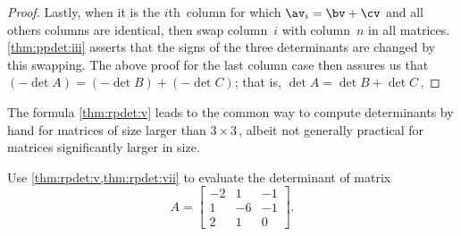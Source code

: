 \begin{proof}
Lastly, when it is the \(i\)th~column for which \(\av_i=\bv+\cv\) and all others columns are identical, then swap column~\(i\) with column~\(n\) in all matrices.  
\cref{thm:ppdet:iii} asserts that the signs of the three determinants are changed by this swapping.
The above proof for the last column case then assures us that \((-\det A)=(-\det B)+(-\det C)\); that is, \(\det A=\det B+\det C\)\,, 
\end{proof}


The  formula \cref{thm:rpdet:v} leads to the common way to compute determinants by hand for matrices of size larger than \(3\times3\)\,, albeit not generally practical for matrices significantly larger in size.

\begin{example} 
Use \cref{thm:rpdet:v,thm:rpdet:vii} to evaluate the determinant of matrix
\begin{equation*}
A=\begin{bmatrix}   -2&1&-1
\\   1 & -6 & -1
\\   2 &  1 & 0
\end{bmatrix}.
\end{equation*}


\end{example}
